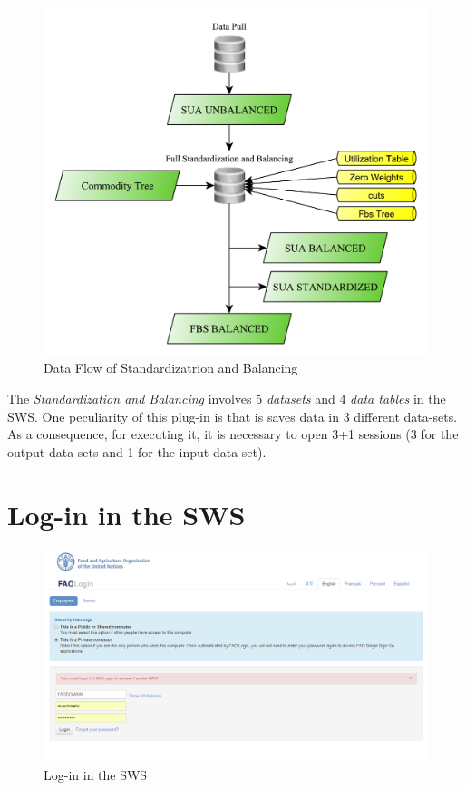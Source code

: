 \documentclass[]{article}
\begin{document}
\begin{figure}[H]

{\centering \includegraphics[width=0.7\linewidth]{images/standPlugin/01_dataFlow} 

}

\caption{\label{fig:f1}Data Flow of Standardizatrion and Balancing}\label{fig:f1}
\end{figure}

The \emph{Standardization and Balancing} involves 5 \emph{datasets} and
4 \emph{data tables} in the SWS. One peculiarity of this plug-in is that
is saves data in 3 different data-sets. As a consequence, for executing
it, it is necessary to open 3+1 sessions (3 for the output data-sets and
1 for the input data-set).

\section{Log-in in the SWS}\label{log-in-in-the-sws}

\begin{figure}[H]

{\centering \includegraphics[width=1\linewidth]{images/standPlugin/02_swsLogin} 

}

\caption{\label{fig:f2}Log-in in the SWS}\label{fig:f2}
\end{figure}
\end{document}
